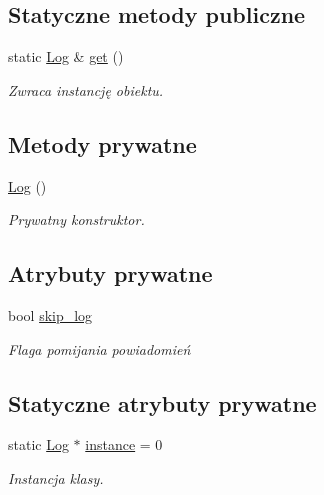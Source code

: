\subsection*{\-Statyczne metody publiczne}
\begin{DoxyCompactItemize}
\item 
static \hyperlink{class_log}{\-Log} \& \hyperlink{class_log_a56dd79779d1b42453c6cf3665ae2b7ac}{get} ()
\begin{DoxyCompactList}\small\item\em \-Zwraca instancję obiektu. \end{DoxyCompactList}\end{DoxyCompactItemize}
\subsection*{\-Metody prywatne}
\begin{DoxyCompactItemize}
\item 
\hyperlink{class_log_af6071a60aa52b6c1b511f99b4bc1b8fe}{\-Log} ()
\begin{DoxyCompactList}\small\item\em \-Prywatny konstruktor. \end{DoxyCompactList}\end{DoxyCompactItemize}
\subsection*{\-Atrybuty prywatne}
\begin{DoxyCompactItemize}
\item 
bool \hyperlink{class_log_a463353fa3f565307672939857d2ad2a3}{skip\-\_\-log}
\begin{DoxyCompactList}\small\item\em \-Flaga pomijania powiadomień \end{DoxyCompactList}\end{DoxyCompactItemize}
\subsection*{\-Statyczne atrybuty prywatne}
\begin{DoxyCompactItemize}
\item 
static \hyperlink{class_log}{\-Log} $\ast$ \hyperlink{class_log_a0ccbba5341fbc543305f93d9763b6b35}{instance} = 0
\begin{DoxyCompactList}\small\item\em \-Instancja klasy. \end{DoxyCompactList}\end{DoxyCompactItemize}


